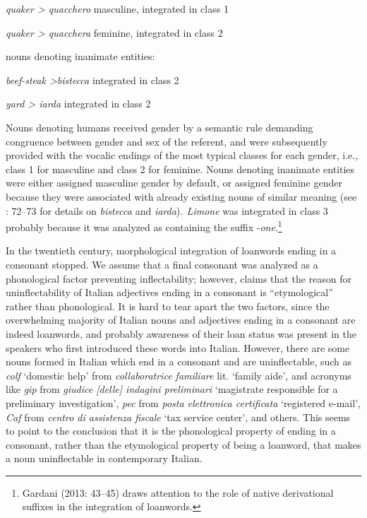 \documentclass[output=paper]{langscibook}
\begin{document}
\textit{quaker > quacchero} masculine, integrated in class 1 

 \textit{quaker > quacchera} feminine, integrated in class 2

nouns denoting inanimate entities:  

\textit{beef\nobreakdash-steak >bistecca} integrated in class 2 

\textit{yard > iarda} integrated in class 2

Nouns denoting humans received gender by a semantic rule demanding congruence between gender and sex of the referent, and were subsequently provided with the vocalic endings of the most typical classes for each gender, i.e., class 1 for masculine and class 2 for feminine. Nouns denoting inanimate entities were either assigned masculine gender by default, or assigned feminine gender because they were associated with already existing nouns of similar meaning (see \citealt{Thornton2003}: 72–73 for details on \textit{bistecca} and \textit{iarda})\textit{. Limone} was integrated in class 3 probably because it was analyzed as containing the suffix \nobreakdash-\textit{one}.\footnote{Gardani (2013: 43–45) draws attention to the role of native derivational suffixes in the integration of loanwords.}

In the twentieth century, morphological integration of loanwords ending in a consonant stopped. We assume that a final consonant was analyzed as a phonological factor preventing inflectability; however, \citet{Fedden2019} claims that the reason for uninflectability of Italian adjectives ending in a consonant is “etymological” rather than phonological. It is hard to tear apart the two factors, since the overwhelming majority of Italian nouns and adjectives ending in a consonant are indeed loanwords, and probably awareness of their loan status was present in the speakers who first introduced these words into Italian. However, there are some nouns formed in Italian which end in a consonant and are uninflectable, such as \textit{colf} ‘domestic help’ from \textit{collaboratrice familiare} lit. ‘family aide’, and acronyms like \textit{gip} from \textit{giudice [delle] indagini preliminari} ‘magistrate responsible for a preliminary investigation’, \textit{pec} from \textit{posta elettronica certificata} ‘registered e-mail’, \textit{Caf} from \textit{centro di assistenza fiscale} ‘tax service center’, and others. This seems to point to the conclusion that it is the phonological property of ending in a consonant, rather than the etymological property of being a loanword, that makes a noun uninflectable in contemporary Italian.
\end{document}
